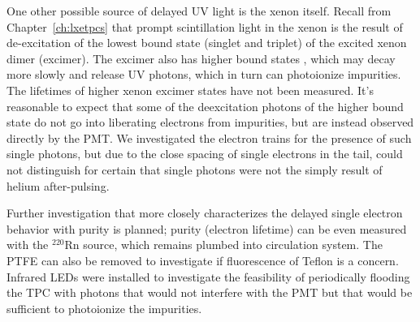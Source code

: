 One other possible source of delayed UV light is the xenon itself. Recall from Chapter~\ref{ch:lxetpcs} that prompt scintillation light in the xenon is the result of de-excitation of the lowest bound state (singlet and triplet) of the excited xenon dimer (excimer). The excimer also has higher bound states \cite{Ermler1979}, which may decay more slowly and release UV photons, which in turn can photoionize impurities. The lifetimes of higher xenon excimer states have not been measured. It's reasonable to expect that some of the deexcitation photons of the higher bound state do not go into liberating electrons from impurities, but are instead observed directly by the \ac{PMT}. We investigated the electron trains for the presence of such single photons, but due to the close spacing of single electrons in the tail, could not distinguish for certain that single photons were not the simply result of helium after-pulsing. 

Further investigation that more closely characterizes the delayed single electron behavior with purity is planned; purity (electron lifetime) can be even measured with the $^{220}$Rn source, which remains plumbed into circulation system. The \ac{PTFE} can also be removed to investigate if fluorescence of Teflon is a concern. Infrared LEDs were installed to investigate the feasibility of periodically flooding the \ac{TPC} with photons that would not interfere with the \ac{PMT} but that would be sufficient to photoionize the impurities. 



